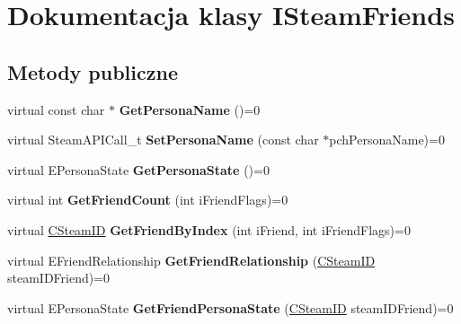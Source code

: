 \hypertarget{class_i_steam_friends}{}\section{Dokumentacja klasy I\+Steam\+Friends}
\label{class_i_steam_friends}
\subsection*{Metody publiczne}
\begin{DoxyCompactItemize}
\item 
\mbox{\label{class_i_steam_friends_a72b5269acb1134b148827644ed401ee5}} 
virtual const char $\ast$ {\bfseries Get\+Persona\+Name} ()=0
\item 
\mbox{\label{class_i_steam_friends_a6bd31942dd75ba2ccc11b9ab2fed5b01}} 
virtual Steam\+A\+P\+I\+Call\+\_\+t {\bfseries Set\+Persona\+Name} (const char $\ast$pch\+Persona\+Name)=0
\item 
\mbox{\label{class_i_steam_friends_a09e87434f6f5d1d9e037c3673d53ab59}} 
virtual E\+Persona\+State {\bfseries Get\+Persona\+State} ()=0
\item 
\mbox{\label{class_i_steam_friends_abbb75008d56eec2f81ce361476d3f7f2}} 
virtual int {\bfseries Get\+Friend\+Count} (int i\+Friend\+Flags)=0
\item 
\mbox{\label{class_i_steam_friends_ab9b45dfe53f34f301ecc6b12efed0a5e}} 
virtual \hyperlink{class_c_steam_i_d}{C\+Steam\+ID} {\bfseries Get\+Friend\+By\+Index} (int i\+Friend, int i\+Friend\+Flags)=0
\item 
\mbox{\label{class_i_steam_friends_a44b9f74602d60cd1a526947a517e5c4a}} 
virtual E\+Friend\+Relationship {\bfseries Get\+Friend\+Relationship} (\hyperlink{class_c_steam_i_d}{C\+Steam\+ID} steam\+I\+D\+Friend)=0
\item 
\mbox{\label{class_i_steam_friends_a5b36ac050fd54ca8c9a2fc7c3f2d6e33}} 
virtual E\+Persona\+State {\bfseries Get\+Friend\+Persona\+State} (\hyperlink{class_c_steam_i_d}{C\+Steam\+ID} steam\+I\+D\+Friend)=0
\item 

\end{DoxyCompactItemize}
